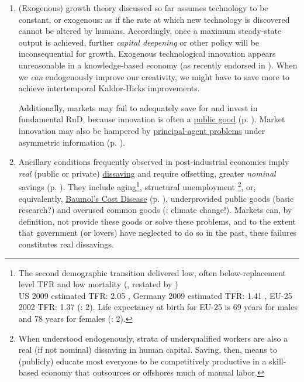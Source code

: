 \begin{enumerate}%
	\item (Exogenous) growth theory discussed so far assumes technology to be constant, or exogenous: as if the rate at which new technology is discovered cannot be altered by humans. Accordingly, once a maximum steady-state output is achieved, further \emph{capital deepening} or other policy will be inconsequential for growth. Exogenous technological innovation appears unreasonable in a knowledge-based economy (as recently endorsed in \citealt{Communities2009}). When we \emph{can} endogenously improve our creativity, we might have to save more to achieve intertemporal Kaldor-Hicks improvements. 

	Additionally, markets may fail to adequately save for and invest in fundamental \gls{RnD}, because innovation is often a \hyperref[sec:publicgood]{public good} (p. \pageref{sec:publicgood}). Market innovation may also be hampered by \hyperref[sec:principal-agentproblem]{principal-agent problems} under asymmetric information (p. \pageref{sec:principal-agentproblem}). 

	\item Ancillary conditions frequently observed in post-industrial economies imply \emph{real} (public or private) \hyperref[sec:deltanetworth]{dissaving} and require offsetting, greater \emph{nominal} savings (p. \pageref{sec:deltanetworth}). They include aging\footnote{
		The second demographic transition delivered low, often below-replacement level \gls{TFR} and low mortality (\citealt{Davis1945}, restated by \citealt{Caldwell-1976-aa}) \\ US 2009 estimated \gls{TFR}: 2.05 \citep{CIA2009}, Germany 2009 estimated \gls{TFR}: 1.41 \citep{CIA2009}, EU-25 2002 \gls{TFR}: 1.37 (\citealt{Demeny-2003-aa}: 2). Life expectancy at birth for EU-25 is 69 years for males and 78 years for females (\citealt{Demeny-2003-aa}: 2).}, 
	structural unemployment \footnote{
		When understood endogenously, strata of underqualified workers are also a real (if not nominal) dissaving in human capital. Saving, then, means to (publicly) educate most everyone to be competitively productive in a skill-based economy that outsources or offshores much of manual labor.}, 
	or, equivalently, \hyperref[it:non-linearreturns]{Baumol's Cost Disease} (p. \pageref{it:non-linearreturns}), underprovided public goods (basic research?) and overused common goods (\citealt{Stern-2006-aa}: climate change!). Markets can, by definition, not provide these goods or solve these problems, and to the extent that government (or lovers) have neglected to do so in the past, these failures constitutes real dissavings.


\end{enumerate}
